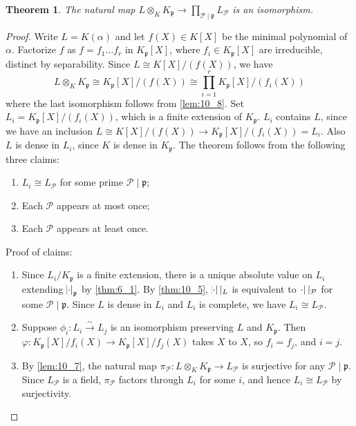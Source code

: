 \documentclass[11pt]{article}
\theoremstyle{definition}
\theoremstyle{plain}
\newtheorem{theorem}[definition]{Theorem}
\theoremstyle{remark}
\newcommand{\cP}{\mathcal{P}}
\newcommand{\fp}{\mathfrak{p}}
\begin{document}
\begin{theorem}\label{thm:10_9}
    The natural map $L \otimes_K K_\fp \to \prod_{\cP \mid \fp} L_\cP$ is an isomorphism.
\end{theorem}
\begin{proof}
    Write $L = K(\alpha)$ and let $f(X) \in K[X]$ be the minimal polynomial of $\alpha$. Factorize $f$ as $f = f_1 \ldots f_r$ in $K_\fp[X]$, where $f_i \in K_\fp[X]$ are irreducible, distinct by separability. Since $L \cong K[X] / (f(X))$, we have
    \begin{equation*}
        L \otimes_K K_\fp \cong K_\fp[X]/(f(X)) \cong \prod_{i=1}^r K_\fp[X]/(f_i(X))
    \end{equation*}
    where the last isomorphism follows from \autoref{lem:10_8}. Set $L_i = K_\fp[X] / (f_i(X))$, which is a finite extension of $K_\fp$. $L_i$ contains $L$, since we have an inclusion $L \cong K[X] / (f(X)) \to K_\fp[X] / (f_i(X)) = L_i$. Also $L$ is dense in $L_i$, since $K$ is dense in $K_\fp$. The theorem follows from the following three claims:
    \begin{enumerate}
        \item $L_i \cong L_\cP$ for some prime $\cP \mid \fp$;
        \item Each $\cP$ appears at most once;
        \item Each $\cP$ appears at least once.
    \end{enumerate}
    Proof of claims:
    \begin{enumerate}
        \item Since $L_i/K_\fp$ is a finite extension, there is a unique absolute value on $L_i$ extending $\abs{\cdot}_\fp$ by \autoref{thm:6_1}. By \autoref{thm:10_5}, $\abs{\cdot} \vert_L$ is equivalent to $\abs{\cdot} \vert_\cP$ for some $\cP \mid \fp$. Since $L$ is dense in $L_i$ and $L_i$ is complete, we have $L_i \cong L_\cP$.
        \item Suppose $\phi_i : L_i \xrightarrow{\sim} L_j$ is an isomorphism preserving $L$ and $K_\fp$. Then $\varphi : K_\fp[X] / f_i(X) \to K_\fp[X] / f_j(X)$ takes $X$ to $X$, so $f_i = f_j$, and $i = j$.
        \item By \autoref{lem:10_7}, the natural map $\pi_\cP : L \otimes_K K_\fp \to L_\cP$ is surjective for any $\cP \mid \fp$. Since $L_\cP$ is a field, $\pi_\cP$ factors through $L_i$ for some $i$, and hence $L_i \cong L_\cP$ by surjectivity. \qedhere
    \end{enumerate}
\end{proof}
\end{document}
